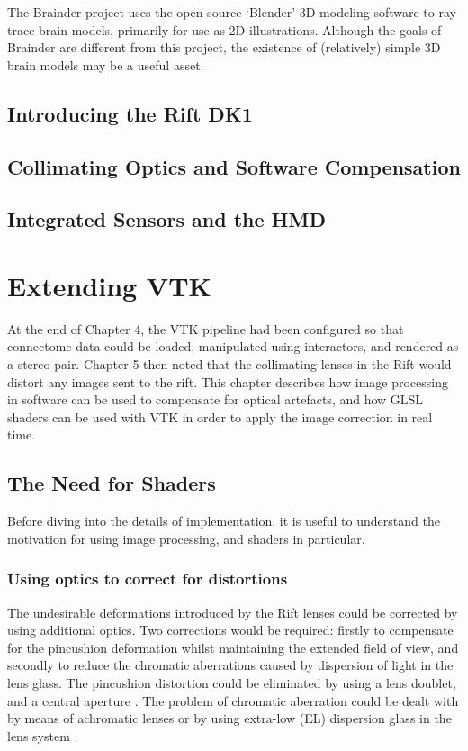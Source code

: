 \documentclass[MSc,paper=a4,pagesize=auto]{icldt}
\begin{document}
The Brainder project uses the open source ‘Blender’ 3D modeling software to ray trace brain models, primarily for use as 2D illustrations. Although the goals of Brainder are different from this project, the existence of (relatively) simple 3D brain models may be a useful asset. 



\section{Introducing the Rift DK1}
\section{Collimating Optics and Software Compensation}
\section{Integrated Sensors and the HMD}

\chapter{Extending VTK}
At the end of Chapter 4, the VTK pipeline had been configured so that connectome data could be loaded, manipulated using interactors, and rendered as a stereo-pair. Chapter 5 then noted that the collimating lenses in the Rift would distort any images sent to the rift. This chapter describes how image processing in software can be used to compensate for optical artefacts, and how GLSL shaders can be used with VTK in order to apply the image correction in real time. 

\clearpage
\section{The Need for Shaders}
\label{sec:need_for_shaders}
Before diving into the details of implementation, it is useful to understand the motivation for using image processing, and shaders in particular. 

\subsection{Using optics to correct for distortions}
The undesirable deformations introduced by the Rift lenses could be corrected by using additional optics. Two corrections would be required: firstly to compensate for the pincushion deformation whilst maintaining the extended field of view, and secondly to reduce the chromatic aberrations caused by dispersion of light in the lens glass. The pincushion distortion could be eliminated by using a lens doublet, and a central aperture \cite{Brainerd2004}. The problem of chromatic aberration could be dealt with by means of achromatic lenses or by using extra-low (EL) dispersion glass in the lens system \cite{Davis2014}. 
\end{document}
